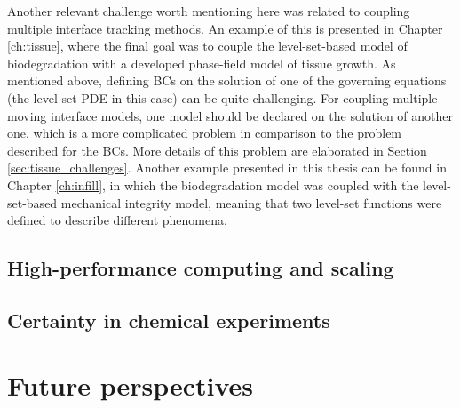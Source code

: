 Another relevant challenge worth mentioning here was related to coupling multiple interface tracking methods. An example of this is presented in Chapter \ref{ch:tissue}, where the final goal was to couple the level-set-based model of biodegradation with a developed phase-field model of tissue growth. As mentioned above, defining BCs on the solution of one of the governing equations (the level-set PDE in this case) can be quite challenging. For coupling multiple moving interface models, one model should be declared on the solution of another one, which is a more complicated problem in comparison to the problem described for the BCs. More details of this problem are elaborated in Section \ref{sec:tissue_challenges}. Another example presented in this thesis can be found in Chapter \ref{ch:infill}, in which the biodegradation model was coupled with the level-set-based mechanical integrity model, meaning that two level-set functions were defined to describe different phenomena.

\subsection{High-performance computing and scaling}


\subsection{Certainty in chemical experiments}


\section{Future perspectives}



\cleardoublepage


